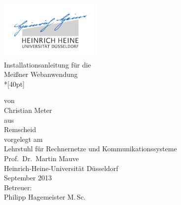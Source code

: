 
\begin{titlepage}
  \centering
  \includegraphics[width=5cm]{fig/unilogo}\\

  \vfill
  \huge
  Installationsanleitung für die\\Meißner Webanwendung\\*[40pt]
  \normalsize

  \vfill
  \large
  \normalsize
  von\\
  \Large
  Christian Meter\\

  \vspace{5mm}
  \normalsize
  aus\\ Remscheid\\[1cm]
  vorgelegt am\\[5mm]
  Lehrstuhl für Rechnernetze und Kommunikationssysteme\\
  Prof.\ Dr.\ Martin Mauve\\ 
  Heinrich-Heine-Universität Düsseldorf\\[0.5cm]
  September 2013\\[0.5cm]
  Betreuer:\\
  Philipp Hagemeister M.\,Sc.
    
\end{titlepage}


